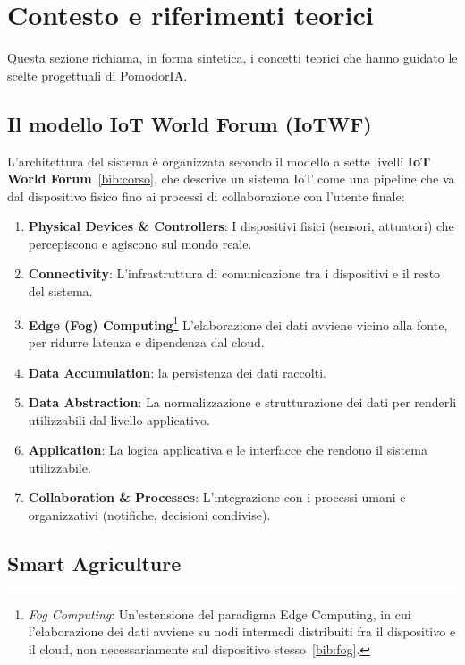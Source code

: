 \section{Contesto e riferimenti teorici}
\label{sec:contesto}

Questa sezione richiama, in forma sintetica, i concetti teorici che hanno
guidato le scelte progettuali di PomodorIA.

\subsection{Il modello IoT World Forum (IoTWF)}
\label{sec:iotwf}

L'architettura del sistema è organizzata secondo il modello a sette livelli
\textbf{IoT World Forum}~\ref{bib:corso}, che descrive un sistema IoT come
una pipeline che va dal dispositivo fisico fino ai processi di
collaborazione con l'utente finale:

\begin{enumerate}
    \item \textbf{Physical Devices \& Controllers}: I dispositivi fisici
    (sensori, attuatori) che percepiscono e agiscono sul mondo reale.
    \item \textbf{Connectivity}: L'infrastruttura di comunicazione tra i
    dispositivi e il resto del sistema.
    \item \textbf{Edge (Fog) Computing}\footnote{\emph{Fog Computing}: Un'estensione
    del paradigma Edge Computing, in cui l'elaborazione dei dati avviene su
    nodi intermedi distribuiti fra il dispositivo e il cloud, non
    necessariamente sul dispositivo stesso~\ref{bib:fog}.} L'elaborazione
 dei dati avviene vicino alla fonte, per ridurre latenza e dipendenza dal cloud.
    \item \textbf{Data Accumulation}:  la persistenza dei dati raccolti.
    \item \textbf{Data Abstraction}: La normalizzazione e strutturazione
    dei dati per renderli utilizzabili dal livello applicativo.
    \item \textbf{Application}: La logica applicativa e le interfacce che
    rendono il sistema utilizzabile.
    \item \textbf{Collaboration \& Processes}: L'integrazione con i
    processi umani e organizzativi (notifiche, decisioni condivise).
\end{enumerate}

\subsection{Smart Agriculture}

